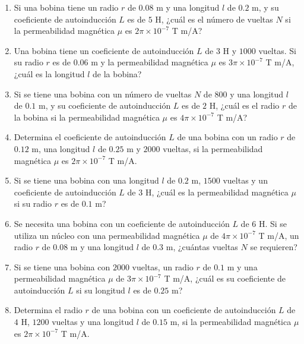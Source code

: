 \documentclass[../main]{subfiles}
\begin{document}
\begin{enumerate}
    \item Si una bobina tiene un radio $r$ de $0.08$ m y una longitud $l$ de $0.2$ m, y su coeficiente de autoinducción $L$ es de $5$ H, ¿cuál es el número de vueltas $N$ si la permeabilidad magnética $\mu$ es $2\pi \times 10^{-7}$ T m/A?
    
    \item Una bobina tiene un coeficiente de autoinducción $L$ de $3$ H y $1000$ vueltas. Si su radio $r$ es de $0.06$ m y la permeabilidad magnética $\mu$ es $3\pi \times 10^{-7}$ T m/A, ¿cuál es la longitud $l$ de la bobina?
    
    \item Si se tiene una bobina con un número de vueltas $N$ de $800$ y una longitud $l$ de $0.1$ m, y su coeficiente de autoinducción $L$ es de $2$ H, ¿cuál es el radio $r$ de la bobina si la permeabilidad magnética $\mu$ es $4\pi \times 10^{-7}$ T m/A?
    
    \item Determina el coeficiente de autoinducción $L$ de una bobina con un radio $r$ de $0.12$ m, una longitud $l$ de $0.25$ m y $2000$ vueltas, si la permeabilidad magnética $\mu$ es $2\pi \times 10^{-7}$ T m/A.
    
    \item Si se tiene una bobina con una longitud $l$ de $0.2$ m, $1500$ vueltas y un coeficiente de autoinducción $L$ de $3$ H, ¿cuál es la permeabilidad magnética $\mu$ si su radio $r$ es de $0.1$ m?
    
    \item Se necesita una bobina con un coeficiente de autoinducción $L$ de $6$ H. Si se utiliza un núcleo con una permeabilidad magnética $\mu$ de $4\pi \times 10^{-7}$ T m/A, un radio $r$ de $0.08$ m y una longitud $l$ de $0.3$ m, ¿cuántas vueltas $N$ se requieren?
    
    \item Si se tiene una bobina con $2000$ vueltas, un radio $r$ de $0.1$ m y una permeabilidad magnética $\mu$ de $3\pi \times 10^{-7}$ T m/A, ¿cuál es su coeficiente de autoinducción $L$ si su longitud $l$ es de $0.25$ m?
    
    \item Determina el radio $r$ de una bobina con un coeficiente de autoinducción $L$ de $4$ H, $1200$ vueltas y una longitud $l$ de $0.15$ m, si la permeabilidad magnética $\mu$ es $2\pi \times 10^{-7}$ T m/A.
\end{enumerate}
\end{document}

